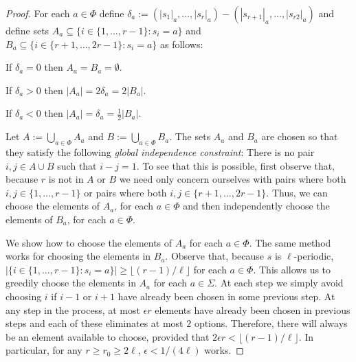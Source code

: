 \documentclass{patmorin}
\begin{document}
\begin{proof}
    For each $a\in\Phi$ define $\delta_a := (|s_1|_a,\ldots,|s_r|_a)-(|s_{r+1}|_a,\ldots,|s_{r2}|_a)$ and define sets $A_a\subseteq\{i\in \{1,\ldots,r-1\}: s_i=a\}$ and $B_a\subseteq\{i\in\{r+1,\ldots,2r-1\}:s_i=a\}$ as follows:
    \begin{compactenum}
        \item If $\delta_a=0$ then $A_a=B_a=\emptyset$.
        \item If $\delta_a>0$ then $|A_a|=2\delta_a=2|B_a|$.
        \item If $\delta_a<0$ then $|A_a|=\delta_a=\tfrac{1}{2}|B_a|$.
    \end{compactenum}
    Let $A:=\bigcup_{a\in\Phi} A_a$ and $B:=\bigcup_{a\in\Phi} B_a$.
    The sets $A_a$ and $B_a$ are chosen so that they satisfy the following \emph{global independence constraint}:  There is no pair $i,j\in A\cup B$ such that $i-j=1$.  To see that this is possible, first observe that, because $r$ is not in $A$ or $B$ we need only concern ourselves with pairs where both $i,j\in\{1,\ldots,r-1\}$ or pairs where both $i,j\in\{r+1,\ldots,2r-1\}$.  Thus, we can choose the elements of $A_a$, for each $a\in\Phi$ and then independently choose the elements of $B_a$, for each $a\in\Phi$.

    We show how to choose the elements of $A_a$ for each $a\in\Phi$.  The same method works for choosing the elements in $B_a$. Observe that, because $s$ is $\ell$-periodic, $|\{i\in \{1,\ldots,r-1\}:s_i=a\}|\ge \lfloor(r-1)/\ell\rfloor$ for each $a\in\Phi$.  This allows us to greedily choose the elements in $A_a$ for each $a\in\Sigma$. At each step we simply avoid choosing $i$ if $i-1$ or $i+1$ have already been chosen in some previous step.  At any step in the process, at most $\epsilon r$ elements have already been chosen in previous steps and each of these eliminates at most $2$ options.  Therefore, there will always be an element available to choose, provided that $2\epsilon r < \lfloor(r-1)/\ell\rfloor$.  In particular, for any $r\ge r_0\ge 2\ell$, $\epsilon < 1/(4\ell)$ works.


\end{proof}
\end{document}
